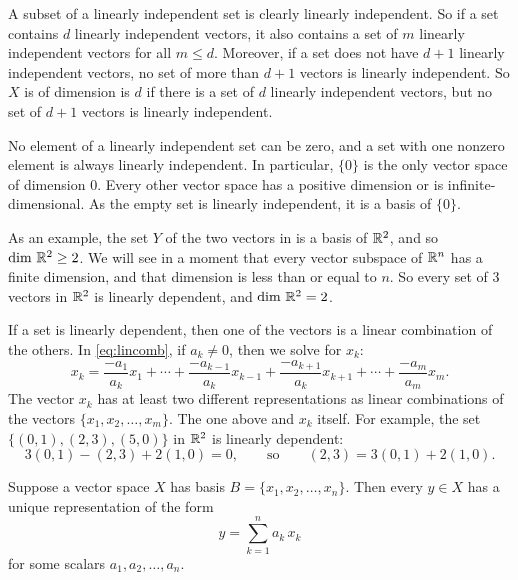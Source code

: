 A subset of a linearly independent set is clearly linearly independent.
So if a set contains $d$ linearly independent vectors, it also contains a
set of $m$ linearly independent vectors for all $m \leq d$.
Moreover, if a set does not have $d+1$
linearly independent vectors, no set of more than $d+1$ vectors is linearly
independent.
So $X$ is of dimension is $d$ if there
is a set of $d$ linearly independent vectors, but no
set of $d+1$ vectors is linearly independent.

No element of a linearly independent set can be zero,
and a set with one nonzero element is always linearly independent.
In particular, $\{ 0 \}$ is the only vector space of dimension $0$.
Every other vector space has a positive dimension
or is infinite-dimensional.
As the empty set is linearly independent, it is a basis
of $\{ 0 \}$.

As an example, the
set $Y$ of the two vectors in
 is a basis of ${\mathbb{R}}^2$, and so
$\dim \, {\mathbb{R}}^2 \geq 2$.
We will see in a moment that every vector subspace of ${\mathbb{R}}^n$
has a finite dimension, and that dimension is less than or equal to $n$.
So every set of 3 vectors in ${\mathbb{R}}^2$ is linearly dependent, and
$\dim \, {\mathbb{R}}^2 = 2$.

If a set is linearly dependent, then one of the
vectors is a linear combination of the others.
In \eqref{eq:lincomb},
if $a_k \not= 0$, then we solve for $x_k$:
\begin{equation*}
x_k = \frac{-a_1}{a_k} x_1 + \cdots + 
\frac{-a_{k-1}}{a_k} x_{k-1} +
\frac{-a_{k+1}}{a_k} x_{k+1} +
\cdots + 
\frac{-a_m}{a_m} x_m .
\end{equation*}
The vector $x_k$ has at least two different representations
as linear combinations of the vectors $\{ x_1,x_2,\ldots,x_m \}$. The one above and
$x_k$ itself. 
For example, the set $\bigl\{ (0,1), (2,3), (5,0) \bigr\}$ in ${\mathbb{R}}^2$ is linearly dependent:
\begin{equation*}
3(0,1) - (2,3) + 2(1,0) = 0 ,
\qquad \text{so} \qquad
(2,3) = 3(0,1) + 2(1,0) .
\end{equation*}

\begin{prop}
Suppose a vector space $X$ has basis 
$B = \{ x_1, x_2, \ldots, x_n \}$.  Then
every $y \in X$ has a unique representation of the form
\begin{equation*}
y = \sum_{k=1}^n a_k \, x_k
\end{equation*}
for some scalars $a_1, a_2, \ldots, a_n$.
\end{prop}


